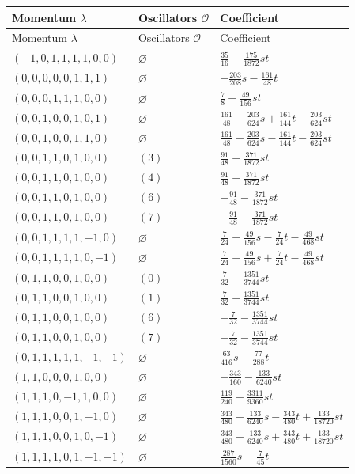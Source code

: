 \begingroup\scriptsize
\setlength{\tabcolsep}{5pt}
\begin{longtable}{@{}lll@{}}
\toprule
Momentum $\lambda$ & Oscillators $\mathcal O$ & Coefficient\\
\midrule\endfirsthead
\toprule
Momentum $\lambda$ & Oscillators $\mathcal O$ & Coefficient\\
\midrule\endhead
\bottomrule\endfoot
$(-1,0,1,1,1,1,0,0)$ & $\varnothing$ & $\frac{35}{16}+\allowbreak \frac{175}{1872}st$\\
$(0,0,0,0,0,1,1,1)$ & $\varnothing$ & $-\frac{203}{208}s-\frac{161}{48}t$\\
$(0,0,0,1,1,1,0,0)$ & $\varnothing$ & $\frac{7}{8}-\frac{49}{156}st$\\
$(0,0,1,0,0,1,0,1)$ & $\varnothing$ & $\frac{161}{48}+\allowbreak \frac{203}{624}s+\allowbreak \frac{161}{144}t-\frac{203}{624}st$\\
$(0,0,1,0,0,1,1,0)$ & $\varnothing$ & $\frac{161}{48}-\frac{203}{624}s-\frac{161}{144}t-\frac{203}{624}st$\\
$(0,0,1,1,0,1,0,0)$ & $(3)$ & $\frac{91}{48}+\allowbreak \frac{371}{1872}st$\\
$(0,0,1,1,0,1,0,0)$ & $(4)$ & $\frac{91}{48}+\allowbreak \frac{371}{1872}st$\\
$(0,0,1,1,0,1,0,0)$ & $(6)$ & $-\frac{91}{48}-\frac{371}{1872}st$\\
$(0,0,1,1,0,1,0,0)$ & $(7)$ & $-\frac{91}{48}-\frac{371}{1872}st$\\
$(0,0,1,1,1,1,-1,0)$ & $\varnothing$ & $\frac{7}{24}-\frac{49}{156}s-\frac{7}{24}t-\frac{49}{468}st$\\
$(0,0,1,1,1,1,0,-1)$ & $\varnothing$ & $\frac{7}{24}+\allowbreak \frac{49}{156}s+\allowbreak \frac{7}{24}t-\frac{49}{468}st$\\
$(0,1,1,0,0,1,0,0)$ & $(0)$ & $\frac{7}{32}+\allowbreak \frac{1351}{3744}st$\\
$(0,1,1,0,0,1,0,0)$ & $(1)$ & $\frac{7}{32}+\allowbreak \frac{1351}{3744}st$\\
$(0,1,1,0,0,1,0,0)$ & $(6)$ & $-\frac{7}{32}-\frac{1351}{3744}st$\\
$(0,1,1,0,0,1,0,0)$ & $(7)$ & $-\frac{7}{32}-\frac{1351}{3744}st$\\
$(0,1,1,1,1,1,-1,-1)$ & $\varnothing$ & $\frac{63}{416}s-\frac{77}{288}t$\\
$(1,1,0,0,0,1,0,0)$ & $\varnothing$ & $-\frac{343}{160}-\frac{133}{6240}st$\\
$(1,1,1,0,-1,1,0,0)$ & $\varnothing$ & $\frac{119}{240}-\frac{3311}{9360}st$\\
$(1,1,1,0,0,1,-1,0)$ & $\varnothing$ & $\frac{343}{480}+\allowbreak \frac{133}{6240}s-\frac{343}{480}t+\allowbreak \frac{133}{18720}st$\\
$(1,1,1,0,0,1,0,-1)$ & $\varnothing$ & $\frac{343}{480}-\frac{133}{6240}s+\allowbreak \frac{343}{480}t+\allowbreak \frac{133}{18720}st$\\
$(1,1,1,1,0,1,-1,-1)$ & $\varnothing$ & $\frac{287}{1560}s-\frac{7}{45}t$\\
\end{longtable}
\endgroup
